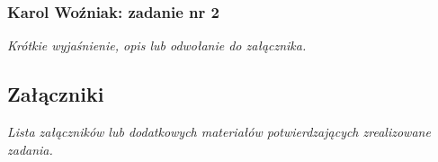 \documentclass[12pt,a4paper,oneside]{article}
\theoremstyle{definition}
\numberwithin{equation}{section}
\begin{document}
\subsubsection{Karol Woźniak: zadanie nr 2}
\textit{Krótkie wyjaśnienie, opis lub odwołanie do załącznika.}

\subsection{Załączniki}
\textit{Lista załączników lub dodatkowych materiałów potwierdzających zrealizowane zadania.}



\renewcommand\refname{Literatura (jeżeli wymagana)}

%
%
%
\end{document}
